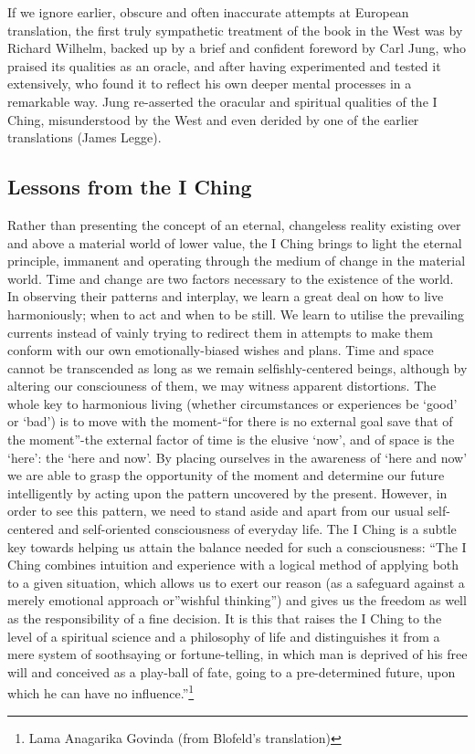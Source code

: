 \documentclass[11pt]{book}
\begin{document}
If we ignore earlier, obscure and often inaccurate attempts at European translation, the first truly sympathetic treatment of the book in the West was by Richard Wilhelm, backed up by a brief and confident foreword by Carl Jung, who praised its qualities as an oracle, and after having experimented and tested it extensively, who found it to reflect his own deeper mental processes in a remarkable way. Jung re-asserted the oracular and spiritual qualities of the I Ching, misunderstood by the West and even derided by one of the earlier translations (James Legge).


\subsection{Lessons from the I Ching}

Rather than presenting the concept of an eternal, changeless reality existing over and above a material world of lower value, the I Ching brings to light the eternal principle, immanent and operating through the medium of change in the material world. Time and change are two factors necessary to the existence of the world. In observing their patterns and interplay, we learn a great deal on how to live harmoniously; when to act and when to be still. We learn to utilise the prevailing currents instead of vainly trying to redirect them in attempts to make them conform with our own emotionally-biased wishes and plans. Time and space cannot be transcended as long as we remain selfishly-centered beings, although by altering our consciouness of them, we may witness apparent distortions. The whole key to harmonious living (whether circumstances or experiences be `good' or `bad') is to move with the moment-``for there is no external goal save that of the moment''-the external factor of time is the elusive `now', and of space is the `here': the `here and now'. By placing ourselves in the awareness of `here and now' we are able to grasp the opportunity of the moment and determine our future intelligently by acting upon the pattern uncovered by the present. However, in order to see this pattern, we need to stand aside and apart from our usual self-centered and self-oriented consciousness of everyday life. The I Ching is a subtle key towards helping us attain the balance needed for such a consciousness: ``The I Ching combines intuition and experience with a logical method of applying both to a given situation, which allows us to exert our reason (as a safeguard against a merely emotional approach or''wishful thinking'') and gives us the freedom as well as the responsibility of a fine decision. It is this that raises the I Ching to the level of a spiritual science and a philosophy of life and distinguishes it from a mere system of soothsaying or fortune-telling, in which man is deprived of his free will and conceived as a play-ball of fate, going to a pre-determined future, upon which he can have no influence.''\footnote{Lama Anagarika Govinda (from Blofeld's translation)}
\end{document}
